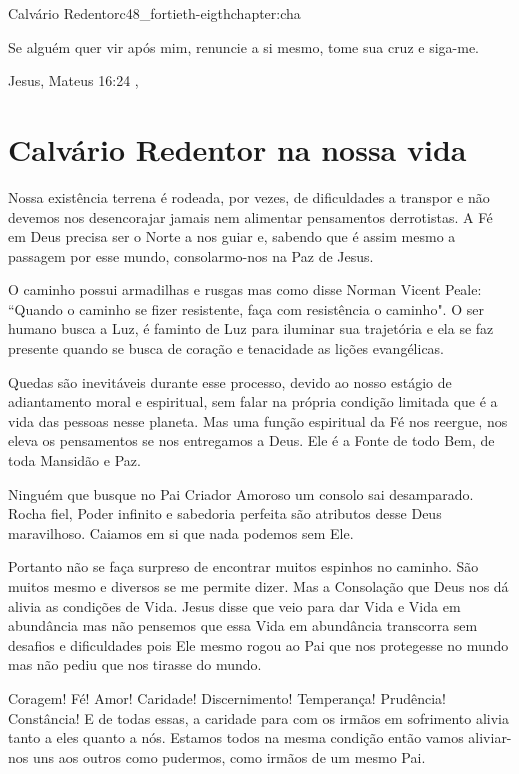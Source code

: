 \begin{chapterpage}{Calvário Redentor}{c48_fortieth-eigthchapter:cha}
 
\begin{myquotation}Se alguém quer vir após mim, renuncie a si mesmo, tome sua cruz e siga-me.
\par\vspace*{15mm}
\mbox{}\hfill \emdash{}Jesus, Mateus 16:24
, %
\par\end{myquotation}

\end{chapterpage}



\section{Calvário Redentor na nossa vida}\label{c1_basicformatting:sec}

\emdash{}Nossa existência terrena é rodeada, por vezes, de dificuldades a transpor e não devemos nos desencorajar jamais nem alimentar pensamentos derrotistas. A Fé em Deus precisa ser o Norte a nos guiar e, sabendo que é assim mesmo a passagem por esse mundo, consolarmo-nos na Paz de Jesus.

\emdash{}O caminho possui armadilhas e rusgas mas como disse Norman Vicent Peale: ``Quando o caminho se fizer resistente, faça com resistência o caminho". O ser humano busca a Luz, é faminto de Luz para iluminar sua trajetória e ela se faz presente quando se busca de coração e tenacidade as lições evangélicas.

\emdash{}Quedas são inevitáveis durante esse processo, devido ao nosso estágio de adiantamento moral e espiritual, sem falar na própria condição limitada que é a vida das pessoas nesse planeta. Mas uma função espiritual da Fé nos reergue, nos eleva os pensamentos se nos entregamos a Deus. Ele é a Fonte de todo Bem, de toda Mansidão e Paz.

\emdash{}Ninguém que busque no Pai Criador Amoroso um consolo sai desamparado. Rocha fiel, Poder infinito e sabedoria perfeita são atributos desse Deus maravilhoso. Caiamos em si que nada podemos sem Ele.

\emdash{}Portanto não se faça surpreso de encontrar muitos espinhos no caminho. São muitos mesmo e diversos se me permite dizer. Mas a Consolação que Deus nos dá alivia as condições de Vida. Jesus disse que veio para dar Vida e Vida em abundância mas não pensemos que essa Vida em abundância transcorra sem desafios e dificuldades pois Ele mesmo rogou ao Pai que nos protegesse no mundo mas não pediu que nos tirasse do mundo.

\emdash{}Coragem! Fé! Amor! Caridade! Discernimento! Temperança! Prudência! Constância! E de todas essas, a caridade para com os irmãos em sofrimento alivia tanto a eles quanto a nós. Estamos todos na mesma condição então vamos aliviar-nos uns aos outros como pudermos, como irmãos de um mesmo Pai.